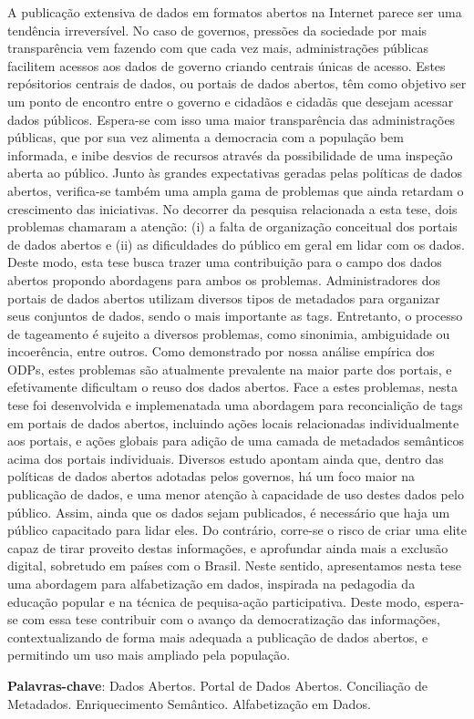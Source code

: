 \setlength{\absparsep}{18pt} %
\begin{resumo}[Resumo]
A publicação extensiva de dados em formatos abertos na Internet parece ser uma tendência irreversível.
No caso de governos, pressões da sociedade por mais transparência vem fazendo com que cada vez mais, administrações públicas facilitem acessos aos dados de governo criando centrais únicas de acesso.
Estes repósitorios centrais de dados, ou portais de dados abertos, têm como objetivo ser um ponto de encontro entre o governo e cidadãos e cidadãs que desejam acessar dados públicos.
Espera-se com isso uma maior transparência das administrações públicas, que por sua vez alimenta a democracia com a população bem informada, e inibe desvios de recursos através da possibilidade de uma inspeção aberta ao público.
Junto às grandes expectativas geradas pelas políticas de dados abertos, verifica-se também uma ampla gama de problemas que ainda retardam o crescimento das iniciativas. 
No decorrer da pesquisa relacionada a esta tese, dois problemas chamaram a atenção: (i) a falta de organização conceitual dos portais de dados abertos e (ii) as dificuldades do público em geral em lidar com os dados.
Deste modo, esta tese busca trazer uma contribuição para o campo dos dados abertos propondo abordagens para ambos os problemas.
Administradores dos portais de dados abertos utilizam diversos tipos de metadados para organizar seus conjuntos de dados, sendo o mais importante as tags.
Entretanto, o processo de tageamento é sujeito a diversos problemas, como sinonimia, ambiguidade ou incoerência, entre outros. 
Como demonstrado por nossa análise empírica dos ODPs, estes problemas são atualmente prevalente na maior parte dos portais, e efetivamente dificultam o reuso dos dados abertos. 
Face a estes problemas, nesta tese foi desenvolvida e implemenatada uma abordagem para reconcialição de tags em portais de dados abertos, incluindo ações locais relacionadas individualmente aos portais, e ações globais para adição de uma camada de metadados semânticos acima dos portais individuais.
Diversos estudo apontam ainda que, dentro das políticas de dados abertos adotadas pelos governos, há um foco maior na publicação de dados, e uma menor atenção à capacidade de uso destes dados pelo público.
Assim, ainda que os dados sejam publicados, é necessário que haja um público capacitado para lidar eles.
Do contrário, corre-se o risco de criar uma elite capaz de tirar proveito destas informações, e aprofundar ainda mais a exclusão digital, sobretudo em países com o Brasil.
Neste sentido, apresentamos nesta tese uma abordagem para alfabetização em dados, inspirada na pedagodia da educação popular e na técnica de pequisa-ação participativa.
Deste modo, espera-se com essa tese contribuir com o avanço da democratização das informações, contextualizando de forma mais adequada a publicação de dados abertos, e permitindo um uso mais ampliado pela população.

\textbf{Palavras-chave}: Dados Abertos. Portal de Dados Abertos. Conciliação de Metadados. Enriquecimento Semântico. Alfabetização em Dados.
\end{resumo}

